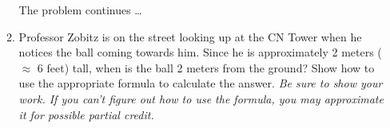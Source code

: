 \documentclass[11pt]{article}
\begin{document}
\begin{enumerate}
\begin{enumerate}
\newpage

\hspace{-.5in}  The problem continues \dots

\item Professor Zobitz is on the street looking up at the CN Tower when he notices the ball coming towards him.  Since he is approximately 2 meters ($\approx$ 6 feet) tall, when is the ball 2 meters from the ground?  Show how to use the appropriate formula to calculate the answer.  \emph{Be sure to show your work.  If you can't figure out how to use the formula, you may approximate it for possible partial credit.}
\vfill
\vfill
\end{enumerate}







\end{enumerate}
\end{document}
